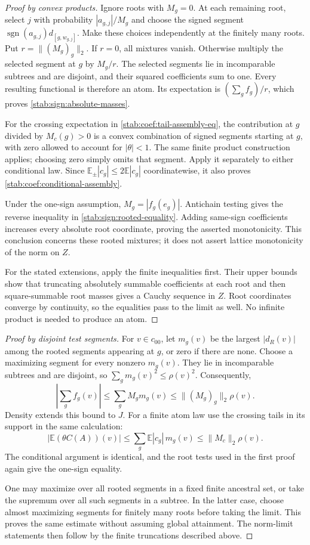 \begin{proof}[Proof by convex products]
Ignore roots with $M_g=0$. At each remaining root, select $j$ with
probability $|a_{g,j}|/M_g$ and choose the signed segment
$\operatorname{sgn}(a_{g,j})d_{[g,w_{g,j}]}$. Make these choices
independently at the finitely many roots. Put $r=\|(M_g)_g\|_2$.
If $r=0$, all mixtures vanish. Otherwise multiply the selected
segment at $g$ by $M_g/r$. The selected segments lie in incomparable
subtrees and are disjoint, and their squared coefficients sum to one.
Every resulting functional is therefore an atom. Its expectation is
$(\sum_g f_g)/r$, which proves \eqref{stab:sign:absolute-masses}.

For the crossing expectation in \eqref{stab:coef:tail-assembly-eq},
the contribution at $g$ divided by $M_c(g)>0$ is a convex combination
of signed segments starting at $g$, with zero allowed to account for
$|\theta|<1$. The same finite product construction applies; choosing
zero simply omits that segment. Apply it separately to either
conditional law. Since
$\mathbb E_\pm|c_g|\le2\mathbb E|c_g|$ coordinatewise, it also
proves \eqref{stab:coef:conditional-assembly}.

Under the one-sign assumption, $M_g=|f_g(e_g)|$.
Antichain testing gives the reverse inequality in
\eqref{stab:sign:rooted-equality}. Adding same-sign coefficients
increases every absolute root coordinate, proving the asserted
monotonicity. This conclusion concerns these rooted mixtures; it does
not assert lattice monotonicity of the norm on $Z$.

For the stated extensions, apply the finite inequalities first.
Their upper bounds show that truncating absolutely summable
coefficients at each root and then square-summable root masses gives
a Cauchy sequence in $Z$. Root coordinates converge by continuity,
so the equalities pass to the limit as well. No infinite product is
needed to produce an atom.
\end{proof}

\begin{proof}[Proof by disjoint test segments]
For $v\in c_{00}$, let $m_g(v)$ be the largest $|d_R(v)|$ among
the rooted segments appearing at $g$, or zero if there are none.
Choose a maximizing segment for every nonzero $m_g(v)$. They lie
in incomparable subtrees and are disjoint, so
$\sum_gm_g(v)^2\le\rho(v)^2$. Consequently,
\[
 \left|\sum_g f_g(v)\right|
 \le\sum_g M_gm_g(v)\le\|(M_g)_g\|_2\rho(v).
\]
Density extends this bound to $J$. For a finite atom law use the
crossing tails in its support in the same calculation:
\[
 |\mathbb E(\theta C(A))(v)|
 \le\sum_g\mathbb E|c_g|\,m_g(v)
 \le\|M_c\|_2\rho(v).
\]
The conditional argument is identical, and the root tests used in
the first proof again give the one-sign equality.

One may maximize over all rooted segments in a fixed finite ancestral
set, or take the supremum over all such segments in a subtree.
In the latter case, choose almost maximizing segments for finitely
many roots before taking the limit. This proves the same estimate
without assuming global attainment. The norm-limit statements then
follow by the finite truncations described above.
\end{proof}
